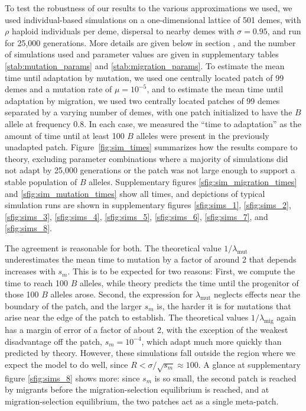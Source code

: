 \documentclass{article}
\newcommand{\migrate}{\lambda_\text{mig}}
\newcommand{\mutrate}{\lambda_\text{mut}}
\newcommand{\secref}[1]{{\emph{\nameref{#1}}}}
\begin{document}
To test the robustness of our results to the various approximations we used,
we used individual-based simulations on a one-dimensional lattice of 501 demes,
with $\rho$ haploid individuals per deme,
dispersal to nearby demes with $\sigma=0.95$,
and run for 25,000 generations. 
More details are given below in section \secref{ss:simulations},
and the number of simulations used and parameter values are given in
supplementary tables \ref{stab:mutation_params} and
\ref{stab:migration_params}. 
To estimate the mean time until adaptation by mutation,
we used one centrally located patch of 99 demes
and a mutation rate of $\mu=10^{-5}$,
and to estimate the mean time until adaptation by migration,
we used two centrally located patches of 99 demes
separated by a varying number of demes,
with one patch initialized to have the $B$ allele at frequency 0.8.
In each case, we measured the ``time to adaptation'' as the amount of time until at least 100 $B$ alleles
were present in the previously unadapted patch.
Figure~\ref{fig:sim_times}
summarizes how the results compare to theory,
excluding parameter combinations where a majority of simulations did not adapt by 25,000 generations
or the patch was not large enough to support a stable population of $B$ alleles.
Supplementary figures \ref{sfig:sim_migration_times} and \ref{sfig:sim_mutation_times} 
show all times, 
and depictions of typical simulation runs are shown in supplementary figures
\ref{sfig:sims_1}, \ref{sfig:sims_2}, \ref{sfig:sims_3}, \ref{sfig:sims_4}, \ref{sfig:sims_5}, \ref{sfig:sims_6}, \ref{sfig:sims_7}, and \ref{sfig:sims_8}.

The agreement is reasonable for both.
The theoretical value $1/\mutrate$ underestimates the mean time to mutation
by a factor of around 2 that depends increases with $s_m$.
This is to be expected for two reasons:
First, we compute the time to reach 100 $B$ alleles, while theory predicts
the time until the progenitor of those 100 $B$ alleles arose.
Second, the expression for $\mutrate$ neglects effects near the boundary of the patch,
and the larger $s_m$ is, 
the harder it is for mutations that arise near the edge of the patch to establish.
The theoretical values $1/\migrate$ again has a margin of error of a factor of about 2,
with the exception of the weakest disadvantage off the patch, $s_m=10^{-4}$,
which adapt much more quickly than predicted by theory.
However, these simulations fall outside the region where we expect the model to do well,
since $R < \sigma/\sqrt{s_m} \approx 100$.
A glance at supplementary figure \ref{sfig:sims_8} shows more:
since $s_m$ is so small, the second patch is reached by migrants before the migration-selection equilibrium is reached,
and at migration-selection equilibrium, the two patches act as a single meta-patch.
\end{document}
